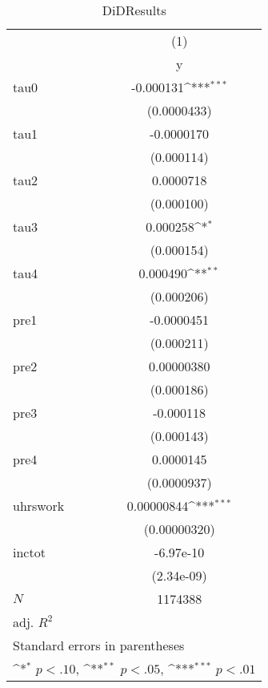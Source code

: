 \begin{table}[htbp]\centering
\def\sym#1{\ifmmode^{#1}\else\(^{#1}\)\fi}
\caption{DiDResults}
\begin{tabular}{l*{1}{c}}
\hline\hline
            &\multicolumn{1}{c}{(1)}\\
            &\multicolumn{1}{c}{y}\\
\hline
tau0        &   -0.000131\sym{***}\\
            & (0.0000433)         \\
[1em]
tau1        &  -0.0000170         \\
            &  (0.000114)         \\
[1em]
tau2        &   0.0000718         \\
            &  (0.000100)         \\
[1em]
tau3        &    0.000258\sym{*}  \\
            &  (0.000154)         \\
[1em]
tau4        &    0.000490\sym{**} \\
            &  (0.000206)         \\
[1em]
pre1        &  -0.0000451         \\
            &  (0.000211)         \\
[1em]
pre2        &  0.00000380         \\
            &  (0.000186)         \\
[1em]
pre3        &   -0.000118         \\
            &  (0.000143)         \\
[1em]
pre4        &   0.0000145         \\
            & (0.0000937)         \\
[1em]
uhrswork    &  0.00000844\sym{***}\\
            &(0.00000320)         \\
[1em]
inctot      &   -6.97e-10         \\
            &  (2.34e-09)         \\
\hline
\(N\)       &     1174388         \\
adj. \(R^{2}\)&                     \\
\hline\hline
\multicolumn{2}{l}{\footnotesize Standard errors in parentheses}\\
\multicolumn{2}{l}{\footnotesize \sym{*} \(p<.10\), \sym{**} \(p<.05\), \sym{***} \(p<.01\)}\\
\end{tabular}
\end{table}
